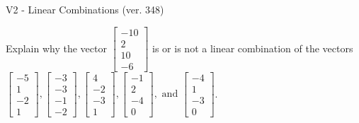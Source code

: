 \begin{exercise}
  \begin{exerciseTitle}V2 - Linear Combinations (ver. 348)\end{exerciseTitle}
  \begin{exerciseStatement}
    Explain why the vector \(\left[\begin{array}{c}
-10 \\
2 \\
10 \\
-6
\end{array}\right]\)  is or is not a linear 
	combination of the vectors \(\left[\begin{array}{c}
-5 \\
1 \\
-2 \\
1
\end{array}\right] , \left[\begin{array}{c}
-3 \\
-3 \\
-1 \\
-2
\end{array}\right] , \left[\begin{array}{c}
4 \\
-2 \\
-3 \\
1
\end{array}\right] , \left[\begin{array}{c}
-1 \\
2 \\
-4 \\
0
\end{array}\right] , \text{ and } \left[\begin{array}{c}
-4 \\
1 \\
-3 \\
0
\end{array}\right]\).
	



\end{exerciseStatement}
\end{exercise}

